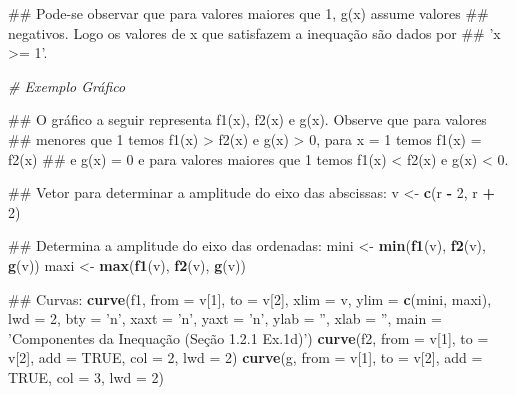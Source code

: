 \documentclass[]{book}
\newenvironment{Shaded}{\begin{snugshade}}{\end{snugshade}}
\newcommand{\KeywordTok}[1]{\textcolor[rgb]{0.13,0.29,0.53}{\textbf{#1}}}
\newcommand{\DataTypeTok}[1]{\textcolor[rgb]{0.13,0.29,0.53}{#1}}
\newcommand{\DecValTok}[1]{\textcolor[rgb]{0.00,0.00,0.81}{#1}}
\newcommand{\StringTok}[1]{\textcolor[rgb]{0.31,0.60,0.02}{#1}}
\newcommand{\CommentTok}[1]{\textcolor[rgb]{0.56,0.35,0.01}{\textit{#1}}}
\newcommand{\OtherTok}[1]{\textcolor[rgb]{0.56,0.35,0.01}{#1}}
\newcommand{\OperatorTok}[1]{\textcolor[rgb]{0.81,0.36,0.00}{\textbf{#1}}}
\newcommand{\NormalTok}[1]{#1}
\begin{document}
\begin{enumerate}
\begin{Shaded}
\begin{Highlighting}[]
\NormalTok{##  Pode-se observar que para valores maiores que 1, g(x) assume valores}
\NormalTok{## negativos. Logo os valores de x que satisfazem a inequação são dados por}
\NormalTok{## 'x >= 1'.}

\CommentTok{# Exemplo Gráfico}

\NormalTok{##  O gráfico a seguir representa f1(x), f2(x) e g(x). Observe que para valores}
\NormalTok{## menores que 1 temos f1(x) > f2(x) e g(x) > 0, para x = 1 temos f1(x) = f2(x)}
\NormalTok{## e g(x) = 0 e para valores maiores que 1 temos f1(x) < f2(x) e g(x) < 0.}

\NormalTok{##  Vetor para determinar a amplitude do eixo das abscissas:}
\NormalTok{v <-}\StringTok{ }\KeywordTok{c}\NormalTok{(r }\OperatorTok{-}\StringTok{ }\DecValTok{2}\NormalTok{, r }\OperatorTok{+}\StringTok{ }\DecValTok{2}\NormalTok{)}

\NormalTok{##  Determina  a amplitude do eixo das ordenadas:}
\NormalTok{mini <-}\StringTok{ }\KeywordTok{min}\NormalTok{(}\KeywordTok{f1}\NormalTok{(v), }\KeywordTok{f2}\NormalTok{(v), }\KeywordTok{g}\NormalTok{(v))}
\NormalTok{maxi <-}\StringTok{ }\KeywordTok{max}\NormalTok{(}\KeywordTok{f1}\NormalTok{(v), }\KeywordTok{f2}\NormalTok{(v), }\KeywordTok{g}\NormalTok{(v))}

\NormalTok{##  Curvas:}
\KeywordTok{curve}\NormalTok{(f1, }\DataTypeTok{from =}\NormalTok{ v[}\DecValTok{1}\NormalTok{], }\DataTypeTok{to =}\NormalTok{ v[}\DecValTok{2}\NormalTok{], }\DataTypeTok{xlim =}\NormalTok{ v, }\DataTypeTok{ylim =} \KeywordTok{c}\NormalTok{(mini, maxi), }\DataTypeTok{lwd =} \DecValTok{2}\NormalTok{,}
  \DataTypeTok{bty =} \StringTok{'n'}\NormalTok{, }\DataTypeTok{xaxt =} \StringTok{'n'}\NormalTok{, }\DataTypeTok{yaxt =} \StringTok{'n'}\NormalTok{, }\DataTypeTok{ylab =} \StringTok{''}\NormalTok{, }\DataTypeTok{xlab =} \StringTok{''}\NormalTok{,}
  \DataTypeTok{main =} \StringTok{'Componentes da Inequação (Seção 1.2.1 Ex.1d)'}\NormalTok{)}
\KeywordTok{curve}\NormalTok{(f2, }\DataTypeTok{from =}\NormalTok{ v[}\DecValTok{1}\NormalTok{], }\DataTypeTok{to =}\NormalTok{ v[}\DecValTok{2}\NormalTok{], }\DataTypeTok{add =} \OtherTok{TRUE}\NormalTok{, }\DataTypeTok{col =} \DecValTok{2}\NormalTok{, }\DataTypeTok{lwd =} \DecValTok{2}\NormalTok{)}
\KeywordTok{curve}\NormalTok{(g, }\DataTypeTok{from =}\NormalTok{ v[}\DecValTok{1}\NormalTok{], }\DataTypeTok{to =}\NormalTok{ v[}\DecValTok{2}\NormalTok{], }\DataTypeTok{add =} \OtherTok{TRUE}\NormalTok{, }\DataTypeTok{col =} \DecValTok{3}\NormalTok{, }\DataTypeTok{lwd =} \DecValTok{2}\NormalTok{)}


\end{Highlighting}
\end{Shaded}
\end{enumerate}
\end{document}
